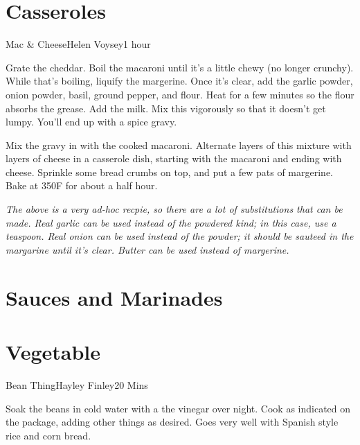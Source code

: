 \documentclass{book}
\begin{document}
\chapter{Casseroles}
\begin{recipe}{Mac \& Cheese}{Helen Voysey}{1 hour}

  Grate the cheddar. Boil the macaroni until it's a little chewy (no longer
  crunchy). While that's boiling, liquify the margerine. Once it's clear, add
  the garlic powder, onion powder, basil, ground pepper, and flour. Heat for a
  few minutes so the flour absorbs the grease. Add the milk. Mix this
  vigorously so that it doesn't get lumpy. You'll end up with a spice gravy.

  Mix the gravy in with the cooked macaroni. Alternate layers of this mixture
  with layers of cheese in a casserole dish, starting with the macaroni and
  ending with cheese. Sprinkle some bread crumbs on top, and put a few pats of
  margerine. Bake at 350\0F for about a half hour.
\end{recipe}
{\it The above is a very ad-hoc recpie, so there are a lot of substitutions
  that can be made. Real garlic can be used instead of the powdered kind; in
  this case, use a teaspoon. Real onion can be used instead of the powder; it
  should be sauteed in the margarine until it's clear. Butter can be used
  instead of margerine.}


\chapter{Sauces and Marinades}
\chapter{Vegetable}
\begin{recipe}{Bean Thing}{Hayley Finley}{20 Mins}

  Soak the beans in cold water with a the vinegar over night. Cook as
  indicated on the package, adding other things as desired. Goes very well
  with Spanish style rice and corn bread.
\end{recipe}
\end{document}

